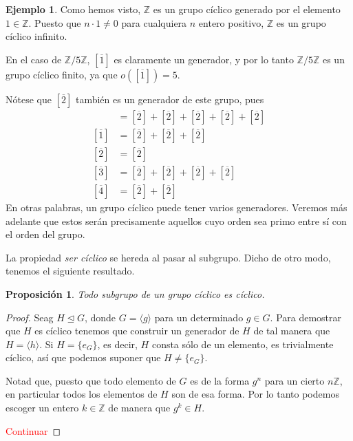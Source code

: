 \documentclass[a4paper,11pt]{amsart}
\theoremstyle{plain}
\newtheorem{prop}[thm]{Proposición}
\theoremstyle{definition}
\newtheorem{ej}[thm]{Ejemplo}
\theoremstyle{remark}
\begin{document}
\begin{ej}
Como hemos visto, $\mathbb{Z}$ es un grupo cíclico generado por el elemento $1 \in \mathbb{Z}$. Puesto que $n \cdot 1 \neq 0$ para cualquiera $n$ entero positivo, $\mathbb{Z}$ es un grupo cíclico infinito. 

En el caso de $\mathbb{Z}/5\mathbb{Z}$, $[\overline{1}]$ es claramente un generador, y por lo tanto $\mathbb{Z}/5\mathbb{Z}$ es un grupo cíclico finito, ya que $o([\overline{1}]) = 5$. 

Nótese que $[\overline{2}]$ también es un generador de este grupo, pues 
\begin{align*}
    [\overline{0}] & = [\overline{2}]+[\overline{2}]+[\overline{2}]+[\overline{2}]+[\overline{2}]\\
    [\overline{1}] & = [\overline{2}]+[\overline{2}]+[\overline{2}]\\
    [\overline{2}] & = [\overline{2}]\\
    [\overline{3}] & = [\overline{2}]+[\overline{2}]+[\overline{2}]+[\overline{2}]\\
    [\overline{4}] & = [\overline{2}]+[\overline{2}]
\end{align*}
En otras palabras, un grupo cíclico puede tener varios generadores. Veremos más adelante que estos serán precisamente aquellos cuyo orden sea primo entre sí con el orden del grupo. 
\end{ej}


La propiedad \textit{ser cíclico} se hereda al pasar al subgrupo. Dicho de otro modo, tenemos el siguiente resultado. 

\begin{prop}
Todo subgrupo de un grupo cíclico es cíclico.
\end{prop}

\begin{proof}
Seag $H \unlhd G$, donde $G = \langle g \rangle$ para un determinado $g \in G$. Para demostrar que $H$ es cíclico tenemos que construir un generador de $H$ de tal manera que $H = \langle h \rangle$. Si $H = \{ e_G\}$, es decir, $H$ consta sólo de un elemento, es trivialmente cíclico, así que podemos suponer que $H \neq \{ e_G\}$. 

Notad que, puesto que todo elemento de $G$ es de la forma $g^n$ para un cierto $n \mathbb{Z}$, en particular todos los elementos de $H$ son de esa forma. Por lo tanto podemos escoger un entero $k \in \mathbb{Z}$ de manera que $g^k \in H$. 

\textcolor{red}{Continuar}
\end{proof}
\end{document}
